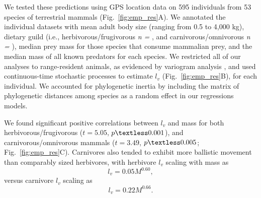 \documentclass[12pt]{article}
\begin{document}
We tested these predictions using GPS location data on 595 individuals from 53 species of terrestrial mammals (Fig.~\ref{fig:emp_res}A). We annotated the individual datasets with mean adult body size (ranging from 0.5 to 4,000 kg), dietary guild (i.e., herbivorous/frugivorous {\it n = }, and carnivorous/omnivorous {\it n = }), median prey mass for those species that consume mammalian prey, and the median mass of all known predators for each species. We restricted all of our analyses to range-resident animals, as evidenced by variogram analysis \cite{Fleming:2014jr}, and used continuous-time stochastic processes to estimate $l_v$ (Fig.~\ref{fig:emp_res}B), for each individual. We accounted for phylogenetic inertia by including the matrix of phylogenetic distances among species as a random effect in our regressions models.

We found significant positive correlations between $l_v$ and mass for both herbivorous/frugivorous ($t = 5.05$, $p \textless 0.001$), and carnivorous/omnivorous mammals ($t = 3.49$, $p \textless 0.005$; Fig.~\ref{fig:emp_res}C). Carnivores also tended to exhibit more ballistic movement than comparably sized herbivores, with herbivore $l_v$ scaling with mass as
\begin{equation}
l_v = 0.05M^{0.60},
\end{equation}
versus carnivore $l_v$ scaling as
\begin{equation}
l_v = 0.22M^{0.66}.
\end{equation}
\end{document}
